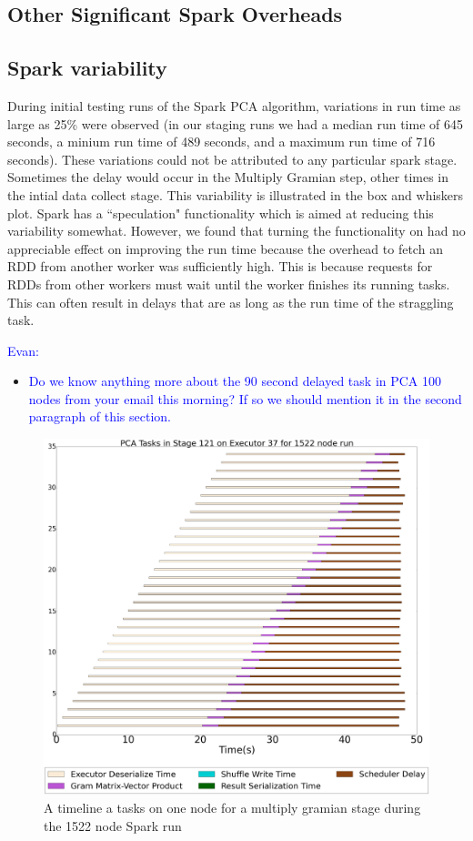 \subsection{Other Significant Spark Overheads}

\subsection{Spark variability}
During initial testing runs of the Spark PCA algorithm, variations in run time as large as 25\% were observed (in our staging runs we had a median run time of 645 seconds, a minium run time of 489 seconds, and a maximum run time of 716 seconds). These variations could not be attributed to any particular spark stage. Sometimes the delay would occur in the Multiply Gramian step, other times in the intial data collect stage. This variability is illustrated in the box and whiskers plot. Spark has a ``speculation" functionality which is aimed at reducing this variability somewhat. However, we found that turning the functionality on had no appreciable effect on improving the run time because the overhead to fetch an RDD from another worker was sufficiently high. This is because requests for RDDs from other workers must wait until the worker finishes its running tasks. This can often result in delays that are as long as the run time of the straggling task.  


\textcolor{blue}{Evan:}
\begin{itemize}
\item \textcolor{blue}{Do we know anything more about the 90 second delayed task in PCA 100 nodes from your email this morning?  If so we should mention it in the second paragraph of this section.}
\end{itemize}



\begin{figure}[t]
\includegraphics[width=.5\textwidth]{fig/spark_pca_hero_timeline.png}
\caption{A timeline a tasks on one node for a multiply gramian stage during the 1522 node Spark run }
\label{fig:hero-timeline}
\end{figure}

